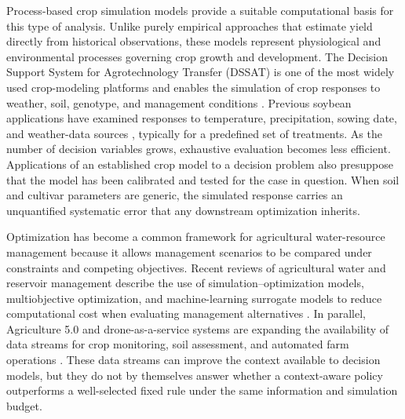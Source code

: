 \documentclass[times,final,authoryear]{elsarticle}
\begin{document}
Process-based crop simulation models provide a suitable computational basis for this type of analysis. Unlike purely empirical approaches that estimate yield directly from historical observations, these models represent physiological and environmental processes governing crop growth and development. The Decision Support System for Agrotechnology Transfer (DSSAT) is one of the most widely used crop-modeling platforms and enables the simulation of crop responses to weather, soil, genotype, and management conditions \citep{ovando2018dssatsoybean, singh2024dssatsoybean}. Previous soybean applications have examined responses to temperature, precipitation, sowing date, and weather-data sources \citep{battisti2017soybeanmodels, battisti2018climatesensitivity, ovando2018dssatsoybean}, typically for a predefined set of treatments. As the number of decision variables grows, exhaustive evaluation becomes less efficient. Applications of an established crop model to a decision problem also presuppose that the model has been calibrated and tested for the case in question. When soil and cultivar parameters are generic, the simulated response carries an unquantified systematic error that any downstream optimization inherits.

Optimization has become a common framework for agricultural water-resource management because it allows management scenarios to be compared under constraints and competing objectives. Recent reviews of agricultural water and reservoir management describe the use of simulation--optimization models, multiobjective optimization, and machine-learning surrogate models to reduce computational cost when evaluating management alternatives \citep{kumari2026optimization}. In parallel, Agriculture 5.0 and drone-as-a-service systems are expanding the availability of data streams for crop monitoring, soil assessment, and automated farm operations \citep{adel2026drones}. These data streams can improve the context available to decision models, but they do not by themselves answer whether a context-aware policy outperforms a well-selected fixed rule under the same information and simulation budget.
\end{document}
